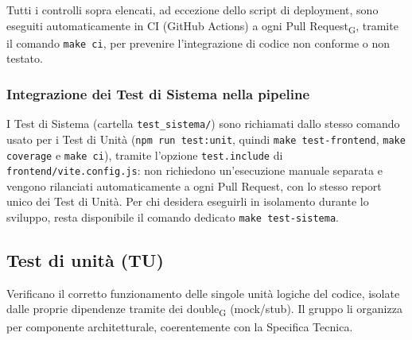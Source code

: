 Tutti i controlli sopra elencati, ad eccezione dello script di deployment, sono eseguiti automaticamente in CI (GitHub Actions) a ogni Pull Request\textsubscript{G}, tramite il comando \texttt{make ci}, per prevenire l'integrazione di codice non conforme o non testato.

\vspace{0.3cm}
\subsubsection*{Integrazione dei Test di Sistema nella pipeline}
I Test di Sistema (cartella \texttt{test\_sistema/}) sono richiamati dallo stesso comando usato per i Test di Unità (\texttt{npm run test:unit}, quindi \texttt{make test-frontend}, \texttt{make coverage} e \texttt{make ci}), tramite l'opzione \texttt{test.include} di \texttt{frontend/vite.config.js}: non richiedono un'esecuzione manuale separata e vengono rilanciati automaticamente a ogni Pull Request, con lo stesso report unico dei Test di Unità. Per chi desidera eseguirli in isolamento durante lo sviluppo, resta disponibile il comando dedicato \texttt{make test-sistema}.

\subsection{Test di unità (TU)}
Verificano il corretto funzionamento delle singole unità logiche del codice, isolate dalle proprie dipendenze tramite dei double\textsubscript{G} (mock/stub). Il gruppo li organizza per componente architetturale, coerentemente con la Specifica Tecnica.

